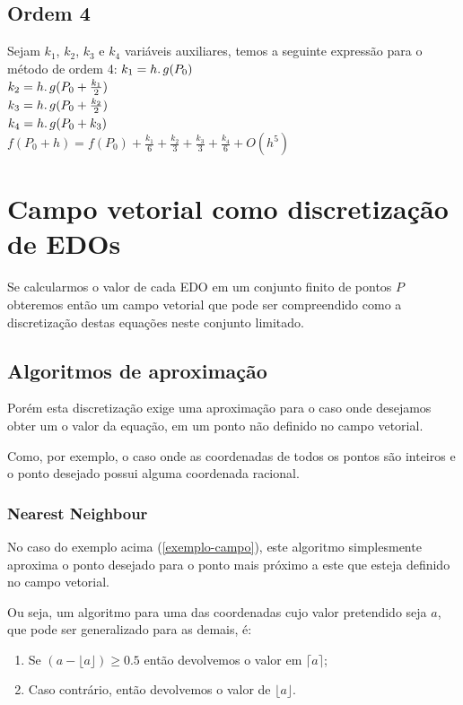   \subsection{Ordem 4}
  Sejam $k_{1}$, $k_{2}$, $k_{3}$ e $k_{4}$ variáveis auxiliares, temos a seguinte expressão para o método de ordem 4:
  \newline
  \newline
  $k_{1} = h\ldotp g(P_{0})$\\
  $k_{2} = h\ldotp g(P_{0} + \frac{k_{1}}{2})$\\
  $k_{3} = h\ldotp g(P_{0} + \frac{k_{2}}{2})$\\
  $k_{4} = h\ldotp g(P_{0} + k_{3})$\\
  $f(P_{0} + h) = f(P_{0}) + \frac{k_{1}}{6} + \frac{k_{2}}{3} + \frac{k_{3}}{3} + \frac{k_{4}}{6} + O(h^{5})$

\section{Campo vetorial como discretização de EDOs}
Se calcularmos o valor de cada EDO em um conjunto finito de pontos $P$ obteremos então um campo vetorial que pode ser compreendido como a discretização destas equações neste conjunto limitado.
  \subsection{Algoritmos de aproximação}\label{aproximacao}
  Porém esta discretização exige uma aproximação para o caso onde desejamos obter um o valor da equação, em um ponto não definido no campo vetorial.

  \label{exemplo-campo}Como, por exemplo, o caso onde as coordenadas de todos os pontos são inteiros e o ponto desejado possui alguma coordenada racional.

    \subsubsection{Nearest Neighbour}
    No caso do exemplo acima (\ref{exemplo-campo}), este algoritmo simplesmente aproxima o ponto desejado para o ponto mais próximo a este que esteja definido no campo vetorial.

    Ou seja, um algoritmo para uma das coordenadas cujo valor pretendido seja $a$, que pode ser generalizado para as demais, é:
    
    \begin{enumerate}
      \item Se $(a - \lfloor a\rfloor) \geq  0.5$ então devolvemos o valor em $\lceil a\rceil$;
      \item Caso contrário, então devolvemos o valor de $\lfloor a\rfloor$.
    \end{enumerate}
    
